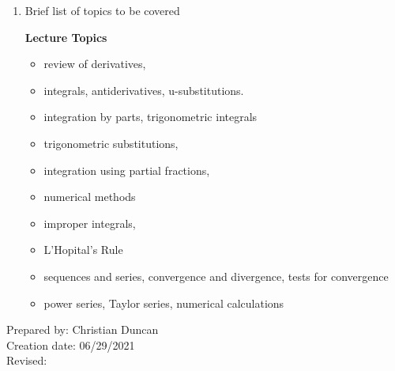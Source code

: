 \begin{enumerate}[1.]
\item Brief list of topics to be covered\\
  {\bfseries
    Lecture Topics
    \begin{itemize}
    \item review of derivatives,
    \item integrals, antiderivatives, u-substitutions.
    \item integration by parts, trigonometric integrals
    \item trigonometric substitutions,
    \item integration using partial fractions,
    \item numerical methods
    \item improper integrals,
    \item L'Hopital’s Rule
    \item sequences and series, convergence and divergence, tests for convergence
    \item power series, Taylor series, numerical calculations
    \end{itemize}
  }

\end{enumerate}

\noindent Prepared by: Christian Duncan\\
\noindent Creation date: 06/29/2021\\
\noindent Revised:\\
